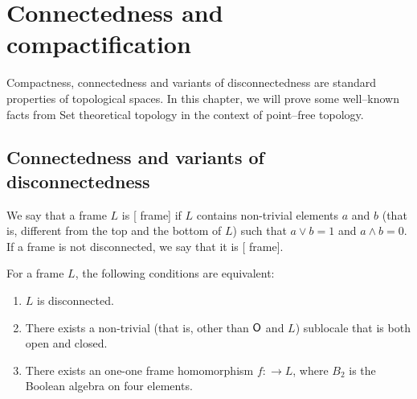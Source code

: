 \chapter{Connectedness and compactification}

Compactness, connectedness and variants of disconnectedness are standard properties of topological spaces.
In this chapter, we will prove some well--known facts from Set theoretical topology in the context of point--free topology.

\section{Connectedness and variants of disconnectedness}
\begin{definition}
    We say that a frame $L$ is [ frame] if $L$ contains non-trivial elements $a$ and $b$ (that is, different from the top and the bottom of $L$) such that $a\vee b = 1$ and $a\wedge b = 0$. If a frame is not disconnected, we say that it is [ frame].
\end{definition}

\begin{observation}\label{p:disconnectednessEquivalently}
    For a frame $L$, the following conditions are equivalent:

    \begin{enumerate}
        \item $L$ is disconnected.
        \item There exists a non-trivial (that is, other than $\mathsf{O}$ and $L$) sublocale that is both open and closed.
        \item There exists an one-one frame homomorphism $f\colon $$ \to L$, where $B_2$ is the Boolean algebra on four elements.
    \end{enumerate}
\end{observation}

